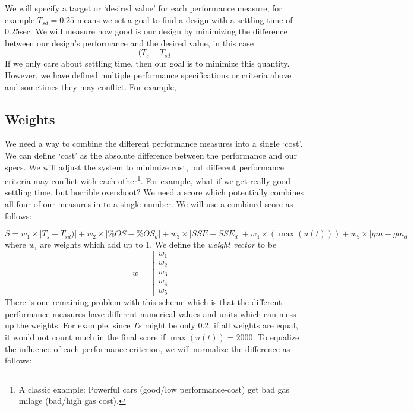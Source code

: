 
We will specify a target or `desired value' for each performance measure, for example $T_{sd} = 0.25$ means we set a goal to find a design with a settling time of $0.25$sec.  We will measure how good is our design by minimizing the difference between our design's performance and the desired value, in this case
\[
|(T_s - T_{sd}|
\]
If we only care about settling time, then our goal is to minimize this quantity.
However, we have defined multiple performance specifications or criteria above and sometimes they may conflict.  For example,


\subsection{Weights}

We need a  way to combine the different performance measures into a single `cost'.  We can define `cost' as the absolute difference between the performance and
our specs. We will adjust the system to minimize cost, but different performance criteria may conflict with each other\footnote{A classic example: Powerful cars (good/low performance-cost) get bad gas milage (bad/high gas cost).}.
For example, what if we get really good settling time, but horrible overshoot?  We need a score which potentially combines all four of our measures in to a single number.   We will use a combined score as follows:	%


\[
S = w_1 \times |T_s-T_{sd})| + w_2 \times |\%OS-\%OS_d| + w_3 \times |SSE-SSE_d| + w_4 \times (\max(u(t))) + w_5\times |gm-gm_d|
\]
where $w_i$ are weights which add up to 1.  We define the {\it weight vector} to be
\[
w = \begin{bmatrix} w_1 \\ w_2 \\ w_3 \\ w_4 \\w_5 \end{bmatrix}
\]
There is one remaining problem with this scheme which is that the different performance measures have different numerical values and units which can mess up the weights.   For example, since $Ts$ might be only 0.2, if all weights are equal, it would not count much in the final score if $\max(u(t)) = 2000$.  To equalize the influence of each performance criterion, we will normalize the difference as follows:



